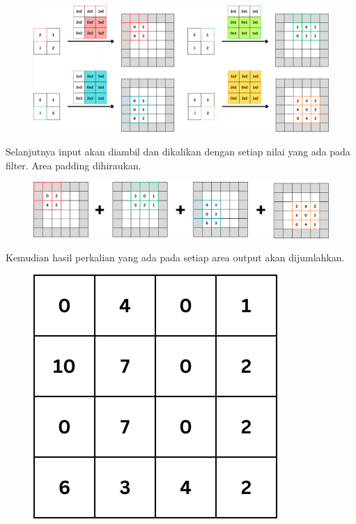 \begin{figure}[H]
	\centering
	\includegraphics[scale=.2]{gambar/lampiran/dekonv-full.png}
\end{figure}

Selanjutnya input akan diambil dan dikalikan dengan setiap nilai yang ada pada filter. Area padding dihiraukan.

\begin{figure}[H]
	\centering
	\includegraphics[scale=.3]{gambar/lampiran/dekonv-7.png}
\end{figure}

Kemudian hasil perkalian yang ada pada setiap area output akan dijumlahkan.

\begin{figure}[H]
	\centering
	\includegraphics[scale=.3]{gambar/lampiran/dekonv-8.png}
\end{figure}

